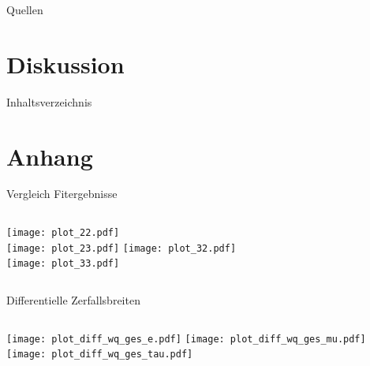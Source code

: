 \documentclass[fleqn, aspectratio=1610, professionalfonts, 9pt]{beamer}
\begin{document}
\begin{frame}{Quellen}
  \tableofcontents[currentsection,currentsubsection,
      hideothersubsections,
      sectionstyle=show/shaded,
  ]\end{frame}

\begin{frame}
    \printbibliography
\end{frame}

\section{Diskussion}

\begin{frame}{Inhaltsverzeichnis}
  \tableofcontents[currentsection,currentsubsection,
      hideothersubsections,
      sectionstyle=show/shaded,
  ]\end{frame}


\appendix
\section{Anhang}


\begin{frame}{Vergleich Fitergebnisse}
  \begin{columns}[t]
    \centering
    \texttt{[image: plot\_22.pdf]}\\
    \texttt{[image: plot\_23.pdf]}
    \centering
    \texttt{[image: plot\_32.pdf]}\\
    \texttt{[image: plot\_33.pdf]}
  \end{columns}
\end{frame}

\begin{frame}{Differentielle Zerfallsbreiten}
  \begin{columns}[t]
    \column{\textwidth}
    \centering
    \texttt{[image: plot\_diff\_wq\_ges\_e.pdf]}
    \texttt{[image: plot\_diff\_wq\_ges\_mu.pdf]}
    \texttt{[image: plot\_diff\_wq\_ges\_tau.pdf]}
  \end{columns}
\end{frame}
\end{document}

